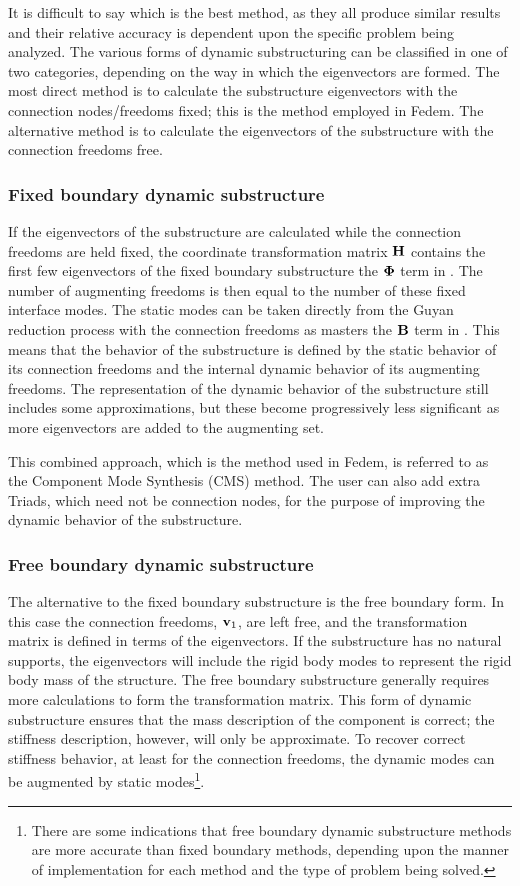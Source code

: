 It is difficult to say which is the best method, as they all produce similar results and their
relative accuracy is dependent upon the specific problem being analyzed. The various forms
of dynamic substructuring can be classified in one of two categories, depending on the way
in which the eigenvectors are formed. The most direct method is to calculate the substructure
eigenvectors with the connection nodes/freedoms fixed; this is the method employed in Fedem.
The alternative method is to calculate the eigenvectors of the substructure with the connection
freedoms free.

\subsubsection{Fixed boundary dynamic substructure}

If the eigenvectors of the substructure are calculated while the connection
freedoms are held fixed, the coordinate transformation matrix $\bf H$ contains
the first few eigenvectors of the fixed boundary substructure
\mdash{}the $\boldsymbol{\Phi}$ term in .
The number of augmenting freedoms is then equal to the number of these fixed
interface modes.
The static modes can be taken directly from the Guyan reduction process with the
connection freedoms as masters \mdash{}the $\bf B$ term in .
This means that the behavior of the substructure is defined by the static
behavior of its connection freedoms and the internal dynamic behavior
of its augmenting freedoms.
The representation of the dynamic behavior of the substructure still includes
some approximations, but these become progressively less significant as more
eigenvectors are added to the augmenting set.

This combined approach, which is the method used in Fedem,
is referred to as the Component Mode Synthesis (CMS) method.
The user can also add extra Triads, which need not be connection nodes,
for the purpose of improving the dynamic behavior of the substructure.

\subsubsection{Free boundary dynamic substructure}

The alternative to the fixed boundary substructure is the free boundary form. In this case
the connection freedoms, ${\bf v}_1$, are left free, and the transformation matrix is defined
in terms of the eigenvectors. If the substructure has no natural supports, the eigenvectors
will include the rigid body modes to represent the rigid body mass of the structure. The free
boundary substructure generally requires more calculations to form the transformation matrix.
This form of dynamic substructure ensures that the mass description of the component is correct;
the stiffness description, however, will only be approximate. To recover correct stiffness
behavior, at least for the connection freedoms, the dynamic modes can be augmented by static
modes\footnote{There are some indications that free boundary dynamic substructure methods
are more accurate than fixed boundary methods, depending upon the manner of implementation
for each method and the type of problem being solved.}.

